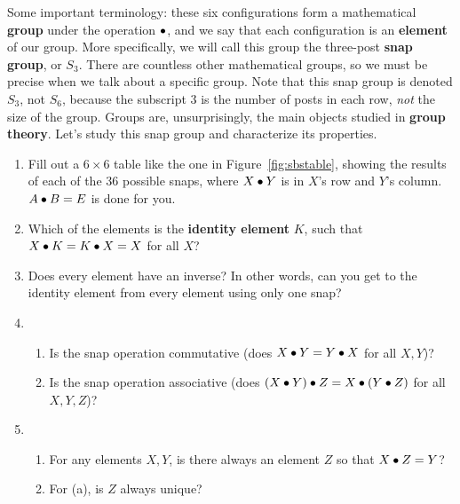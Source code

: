 \documentclass[../textbook.tex]{subfiles}
\begin{document}
Some important terminology: these six configurations form a mathematical \textbf{group} under the operation $\bullet$, and we say that each configuration is an \textbf{element} of our group.
More specifically, we will call this group the three-post \textbf{snap group}, or $S_3$. There are countless other mathematical groups, so we must be precise when we talk about a specific group. Note that this snap group is denoted $S_3$, not $S_6$, because the subscript $3$ is the number of posts in each row, \textit{not} the size of the group.
Groups are, unsurprisingly, the main objects studied in \textbf{group theory}.
Let's study this snap group and characterize its properties.

\begin{enumerate}
\item Fill out a $6\times 6$ table like the one in Figure~\ref{fig:sbstable}, showing the results of each of the $36$ possible snaps, where $X\bullet Y$ is in $X$'s row and $Y$'s column. $A\bullet B=E$ is done for you.
\item Which of the elements is the \textbf{identity element} $K$, such that $X\bullet K = K\bullet X = X$ for all $X$? \label{prob:group_definition_start}
\item Does every element have an inverse? In other words, can you get to the identity element from every element using only one snap?
\item \begin{enumerate}
\item Is the snap operation commutative (does $X \bullet Y = Y \bullet X$ for all $X,Y$)?
\item Is the snap operation associative (does $(X \bullet Y) \bullet Z = X \bullet (Y\bullet Z)$ for all $X,Y,Z$)?
\end{enumerate}
\item \begin{enumerate}
\item For any elements $X, Y$, is there always an element $Z$ so that $X\bullet Z=Y$?
\item For (a), is $Z$ always unique?
\end{enumerate}
\setcounter{some_name}{\value{enumi}}
\end{enumerate}%
\end{document}
